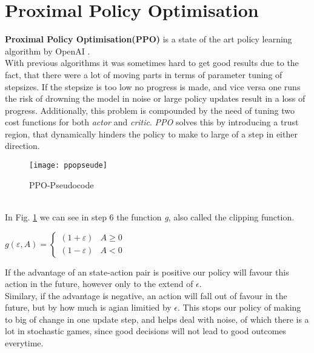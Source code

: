 \section{Proximal Policy Optimisation}
\textbf{Proximal Policy Optimisation(PPO)} is a state of the art policy learning algorithm by OpenAI
.\cite{schulman2017proximal}\\
With previous algorithms it was sometimes hard to get good results due to the fact, that there were a lot of
moving parts in terms of parameter tuning of stepsizes.
If the stepsize is too low no progress is made, and vice versa one runs the risk of drowning the model in noise or
large policy updates result in a loss of progress.
Additionally, this problem is compounded by the need of tuning two cost functions for both \textit{actor} and
\textit{critic}.
\textit{PPO} solves this by introducing a trust region, that dynamically hinders the policy to make to large of a
step in either direction.
\begin{figure}[!ht]
    \centering
    \texttt{[image: ppopseude]}
    \caption{PPO-Pseudocode \cite{actorcritic}}
    \label{Pseudocode}
\end{figure}
\\
In Fig. \ref{Pseudocode} we can see in step 6 the function \textit{g}, also called the clipping function.
\begin{center}
    \begin{math}
        \boxed{
            g(\varepsilon,A) = \left\{\begin{matrix}
            (1+\varepsilon)
                                          & A \geq 0 \\
                                          (1-\varepsilon) & A < 0
            \end{matrix}\right.
        }
    \end{math}
\end{center}
If the advantage of an state-action pair is positive our policy will favour this action in the future, however only
to the extend of $\epsilon.$\\
Similary, if the advantage is negative, an action will fall out of favour in the future, but by how much is agian
limitied by $\epsilon$.
This stops our policy of making to big of change in one update step, and helps deal with noise, of which there is a
lot in stochastic games, since good decisions will not lead to good outcomes everytime.


